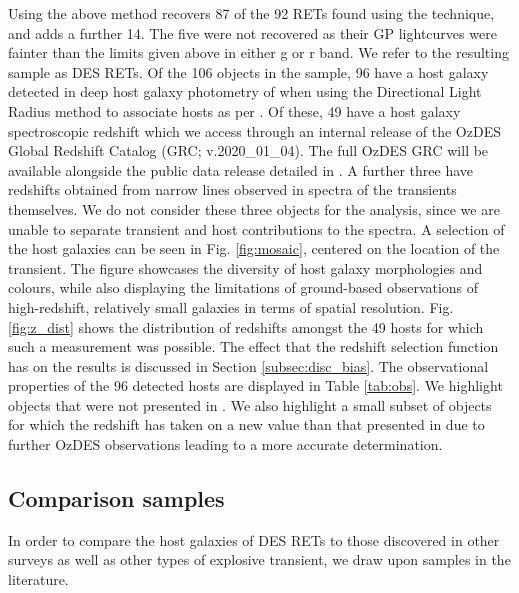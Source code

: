 \documentclass[fleqn,usenatbib,]{mnras}
\newcommand{\replychris}[1]{\color{magenta}#1 \color{black}}
\newcommand{\replylluis}[1]{\color{brown}#1 \color{black}}
\begin{document}
Using the above method recovers 87 of the 92 RETs found using the  technique, and adds a further 14. The five were not recovered as their GP lightcurves were fainter than the limits given above in either g or r band.
We refer to the resulting sample as DES RETs. Of the 106 objects in the sample, 96 have a host galaxy detected in deep host galaxy photometry of \citet{Wiseman2020} when using the Directional Light Radius method \citep{Sullivan2006} to associate hosts as per \citet{Wiseman2020}. Of these, 49 have a host galaxy spectroscopic redshift \replychris{which we access through an internal release of the OzDES Global Redshift Catalog (GRC; v.2020\_01\_04). The full OzDES GRC will be available alongside the public data release detailed in \citet{Lidman2020}}. A further three have redshifts obtained from narrow lines observed in spectra of the transients themselves. We do not consider these three objects for the analysis, since we are unable to separate transient and host contributions to the spectra.
\replylluis{A selection of the host galaxies can be seen in Fig. \ref{fig:mosaic}, centered on the location of the transient. The figure showcases the diversity of host galaxy morphologies and colours, while also displaying the limitations of ground-based observations of high-redshift, relatively small galaxies in terms of spatial resolution.}
Fig. \ref{fig:z_dist} shows the distribution of redshifts amongst the 49 hosts for which such a measurement was possible. The effect that the redshift selection function has on the results is discussed in Section \ref{subsec:disc_bias}.
The observational properties of the 9\replylluis{6} detected hosts are displayed in Table \ref{tab:obs}. We highlight objects that were not presented in . We also highlight a small subset of objects for which the redshift has taken on a new value than that presented in  due to further OzDES observations leading to a more accurate determination. 

\subsection{Comparison samples \label{subsec:comparison}}

In order to compare the host galaxies of DES RETs to those discovered in other surveys as well as other types of explosive transient, we draw upon samples in the literature. 
\end{document}
